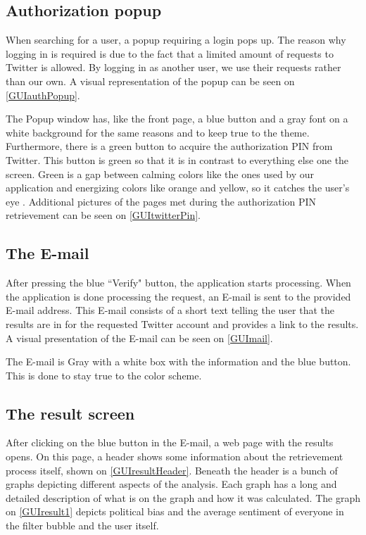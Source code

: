 \subsection{Authorization popup}

When searching for a user, a popup requiring a login pops up. The reason why
logging in is required is due to the fact that a limited amount of requests to
Twitter is allowed. By logging in as another user, we use their requests rather
than our own. A visual representation of the popup can be seen on
\autoref{GUIauthPopup}.


The Popup window has, like the front page, a blue button and a gray font on a
white background for the same reasons and to keep true to the theme.
Furthermore, there is a green button to acquire the authorization PIN from
Twitter. This button is green so that it is in contrast to everything else one
the screen. Green is a gap between calming colors like the ones used by our
application and energizing colors like orange and yellow, so it catches the
user's eye \citep[p. 60]{WebUI}. Additional pictures of the pages met during the
authorization PIN retrievement can be seen on \autoref{GUItwitterPin}.

\subsection{The E-mail}
After pressing the blue ``Verify" button, the application starts processing.
When the application is done processing the request, an E-mail is sent to the provided E-mail address. This E-mail consists of a short text telling the user
that the results are in for the requested Twitter account and provides a link to
the results.
A visual presentation of the E-mail can be seen on \autoref{GUImail}.


The E-mail is Gray with a white box with the information and the blue button.
This is done to stay true to the color scheme. 

\subsection{The result screen}
After clicking on the blue button in the E-mail, a web page with the results
opens. On this page, a header shows some information about the retrievement
process itself, shown on \autoref{GUIresultHeader}. Beneath
the header is a bunch of graphs depicting different aspects of the analysis.
Each graph has a long and detailed description of what is on the graph and how
it was calculated. The graph on \autoref{GUIresult1} depicts political bias and
the average sentiment of everyone in the filter bubble and the user itself. 

